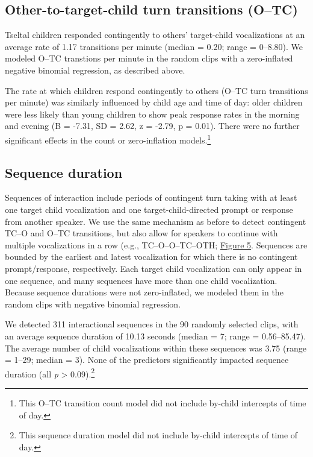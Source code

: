 \documentclass[floatsintext,man]{apa6}
\theoremstyle{definition}
\theoremstyle{definition}
\theoremstyle{definition}
\theoremstyle{remark}
\begin{document}
\subsection{Other-to-target-child turn transitions
(O--TC)}\label{other-to-target-child-turn-transitions-otc}

Tseltal children responded contingently to others' target-child
vocalizations at an average rate of 1.17 transitions per minute (median
= 0.20; range = 0--8.80). We modeled O--TC transtions per minute in the
random clips with a zero-inflated negative binomial regression, as
described above.

The rate at which children respond contingently to others (O--TC turn
transitions per minute) was similarly influenced by child age and time
of day: older children were less likely than young children to show peak
response rates in the morning and evening (B = -7.31, SD = 2.62, z =
-2.79, p = 0.01). There were no further significant effects in the count
or zero-inflation models.\footnote{This O--TC transition count model did
  not include by-child intercepts of time of day.}

\subsection{Sequence duration}\label{sequence-duration}

Sequences of interaction include periods of contingent turn taking with
at least one target child vocalization and one target-child-directed
prompt or response from another speaker. We use the same mechanism as
before to detect contingent TC--O and O--TC transitions, but also allow
for speakers to continue with multiple vocalizations in a row (e.g.,
TC--O--O--TC--OTH; \protect\hyperlink{fig5}{Figure 5}. Sequences are
bounded by the earliest and latest vocalization for which there is no
contingent prompt/response, respectively. Each target child vocalization
can only appear in one sequence, and many sequences have more than one
child vocalization. Because sequence durations were not zero-inflated,
we modeled them in the random clips with negative binomial regression.

We detected 311 interactional sequences in the 90 randomly selected
clips, with an average sequence duration of 10.13 seconds (median = 7;
range = 0.56--85.47). The average number of child vocalizations within
these sequences was 3.75 (range = 1--29; median = 3). None of the
predictors significantly impacted sequence duration (all \emph{p}
\textgreater{} 0.09).\footnote{This sequence duration model did not
  include by-child intercepts of time of day.}
\end{document}
